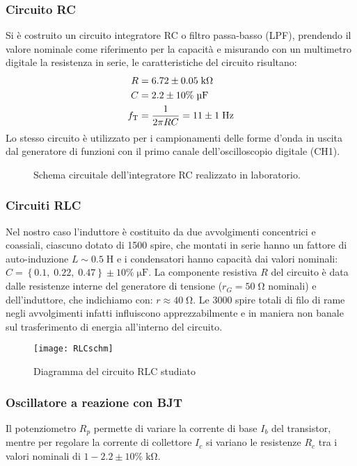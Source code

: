 \documentclass{article}[a4paper, oneside, 11pt]
\begin{document}
\subsubsection{Circuito RC}
Si è costruito un circuito integratore RC o filtro passa-basso (LPF),
prendendo il valore nominale come riferimento per la capacità e misurando
con un multimetro digitale la resistenza in serie, le caratteristiche del
circuito risultano:
\begin{align*}
R &= 6.72 \pm 0.05 \; \si{\kilo\ohm}\\
C &= 2.2 \pm 10\% \; \si{\micro\F}\\
f_{\rm T} &= \frac{1}{2 \pi R C} = 11 \pm 1 \; \si{\hertz}
\end{align*}
Lo stesso circuito è utilizzato per i campionamenti delle forme d'onda in
uscita dal generatore di funzioni con il primo canale dell'oscilloscopio
digitale (CH1).
\begin{figure}[!htb]
	\centering
	
	\caption{Schema circuitale dell'integratore RC realizzato in laboratorio.
	\label{fig: RC}}
\end{figure}
\subsubsection{Circuiti RLC}
Nel nostro caso l'induttore è costituito da due avvolgimenti concentrici
e coassiali, ciascuno dotato di 1500 spire, che montati in serie hanno un
fattore di auto-induzione $L \sim 0.5 \; \si{\henry}$ e i condensatori hanno
capacità dai valori nominali: $C = \left\{0.1,\; 0.22,\; 0.47\right\} \pm
10\% \; \si{\micro\farad}$. La componente resistiva $R$ del circuito è data
dalle resistenze interne del generatore di tensione ($r_G = 50 \; \si{\ohm}$
nominali) e dell'induttore, che indichiamo con: $r \approx 40 \;\si{\ohm}$.
Le $3000$ spire totali di filo di rame negli avvolgimenti infatti
influiscono apprezzabilmente e in maniera non banale sul trasferimento
di energia all'interno del circuito.

\begin{figure}[!htb]
	\centering 
		\texttt{[image: RLCschm]}
	\caption{Diagramma del circuito RLC studiato\label{schm: RLC}}
\end{figure}

\subsubsection{Oscillatore a reazione con BJT}
Il potenziometro $R_p$ permette di variare la corrente di base $I_b$ 
del transistor, mentre per regolare la corrente di collettore $I_c$ si variano
le resistenze $R_c$ tra i valori nominali di $1 - 2.2 \pm 10 \% \; 
\si{\kilo\ohm}$. 
\end{document}
